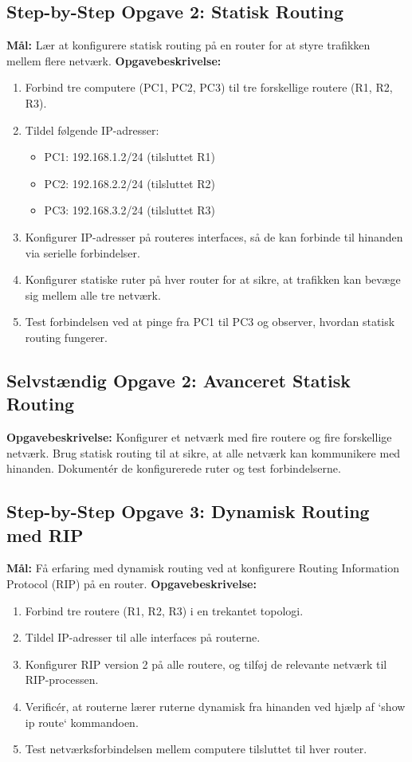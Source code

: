 \subsection*{Step-by-Step Opgave 2: Statisk Routing}
\textbf{Mål:} Lær at konfigurere statisk routing på en router for at styre trafikken mellem flere netværk.
\newline\newline\noindent
\textbf{Opgavebeskrivelse:}
\begin{enumerate}
	\item Forbind tre computere (PC1, PC2, PC3) til tre forskellige routere (R1, R2, R3).
	\item Tildel følgende IP-adresser:
	\begin{itemize}
		\item PC1: 192.168.1.2/24 (tilsluttet R1)
		\item PC2: 192.168.2.2/24 (tilsluttet R2)
		\item PC3: 192.168.3.2/24 (tilsluttet R3)
	\end{itemize}
	\item Konfigurer IP-adresser på routeres interfaces, så de kan forbinde til hinanden via serielle forbindelser.
	\item Konfigurer statiske ruter på hver router for at sikre, at trafikken kan bevæge sig mellem alle tre netværk.
	\item Test forbindelsen ved at pinge fra PC1 til PC3 og observer, hvordan statisk routing fungerer.
\end{enumerate}

\subsection*{Selvstændig Opgave 2: Avanceret Statisk Routing}
\textbf{Opgavebeskrivelse:} Konfigurer et netværk med fire routere og fire forskellige netværk. Brug statisk routing til at sikre, at alle netværk kan kommunikere med hinanden. Dokumentér de konfigurerede ruter og test forbindelserne.

\subsection*{Step-by-Step Opgave 3: Dynamisk Routing med RIP}
\textbf{Mål:} Få erfaring med dynamisk routing ved at konfigurere Routing Information Protocol (RIP) på en router.
\newline\newline\noindent
\textbf{Opgavebeskrivelse:}
\begin{enumerate}
	\item Forbind tre routere (R1, R2, R3) i en trekantet topologi.
	\item Tildel IP-adresser til alle interfaces på routerne.
	\item Konfigurer RIP version 2 på alle routere, og tilføj de relevante netværk til RIP-processen.
	\item Verificér, at routerne lærer ruterne dynamisk fra hinanden ved hjælp af `show ip route` kommandoen.
	\item Test netværksforbindelsen mellem computere tilsluttet til hver router.
\end{enumerate}

